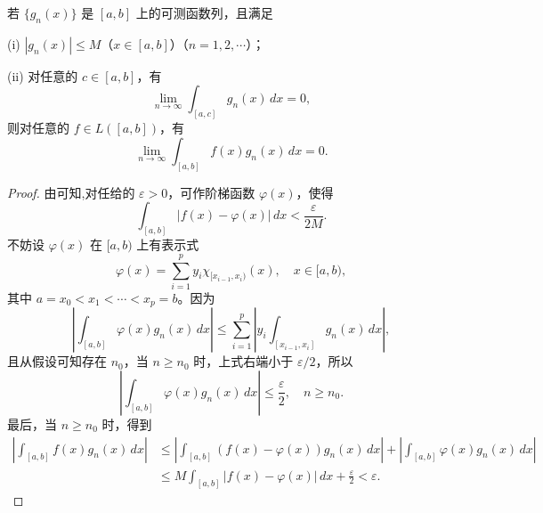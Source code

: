 \documentclass[../../main.tex]{subfiles}
\begin{document}
\begin{theorem}\label{theorem:Riemann-Lebesgue引理的推广}
若 \( \{g_n(x)\} \) 是 \([a,b]\) 上的可测函数列，且满足

(i) \( |g_n(x)| \leqslant M \)（\( x \in [a,b] \)）（\( n = 1,2,\cdots \)）；

(ii) 对任意的 \( c \in [a,b] \)，有
\[
\lim_{n \to \infty} \int_{[a,c]} g_n(x) \, dx = 0,
\]
则对任意的 \( f \in L([a,b]) \)，有
\[
\lim_{n \to \infty} \int_{[a,b]} f(x) g_n(x) \, dx = 0.
\]
\end{theorem}
\begin{proof}
由可知,对任给的 \( \varepsilon > 0 \)，可作阶梯函数 \( \varphi(x) \)，使得
\[
\int_{[a,b]} |f(x) - \varphi(x)| \, dx < \frac{\varepsilon}{2M}.
\]
不妨设 \( \varphi(x) \) 在 \([a,b)\) 上有表示式
\[
\varphi(x) = \sum_{i=1}^p y_i \chi_{[x_{i-1},x_i)}(x), \quad x \in [a,b),
\]
其中 \( a = x_0 < x_1 < \cdots < x_p = b \)。因为
\[
\left| \int_{[a,b]} \varphi(x) g_n(x) \, dx \right| \leqslant \sum_{i=1}^p \left| y_i \int_{[x_{i-1},x_i]} g_n(x) \, dx \right|,
\]
且从假设可知存在 \( n_0 \)，当 \( n \geqslant n_0 \) 时，上式右端小于 \( \varepsilon/2 \)，所以
\[
\left| \int_{[a,b]} \varphi(x) g_n(x) \, dx \right| \leqslant \frac{\varepsilon}{2}, \quad n \geqslant n_0.
\]
最后，当 \( n \geqslant n_0 \) 时，得到
\begin{align*}
\left| \int_{[a,b]} f(x) g_n(x) \, dx \right| &\leqslant \left| \int_{[a,b]} (f(x) - \varphi(x)) g_n(x) \, dx \right| + \left| \int_{[a,b]} \varphi(x) g_n(x) \, dx \right| \\
&\leqslant M \int_{[a,b]} |f(x) - \varphi(x)| \, dx + \frac{\varepsilon}{2} < \varepsilon.
\end{align*}
\end{proof}
\end{document}
